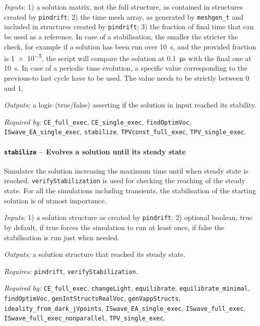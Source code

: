 		\textit{Inputs:} 1) a solution matrix, not the full structure, as contained in
		structures created by \texttt{pin\-drift};
		2) the time mesh array, as generated by \texttt{meshgen\_t} and included
		in structures created by \texttt{pin\-drift};
		3) the fraction of final time that can be used as a
		reference. In case of a stabilisation, the smaller the stricter the
		check, for example if a solution has been run over \SI{10}{\s}, and the provided fraction is \num{1e-5}, the script will compare the solution at \SI{0.1}{\us} with the final one at \SI{10}{\s}. In case of a periodic time evolution, a specific value
		corresponding to the previous-to last cycle have to be used. The
		value needs to be strictly between 0 and 1.

		\textit{Outputs:} a logic (true/false) asserting if the solution in input reached its stability.


		\textit{Required by:} \texttt{CE\_full\_exec}, \texttt{CE\_single\_exec}, \texttt{find\-Optim\-Voc}, \texttt{IS\-wave\_EA\_single\_exec}, \texttt{stabilize}, \texttt{TPV\-const\_full\_exec}, \texttt{TPV\_single\_exec}.

		\paragraph{\texttt{stabilize} -- Evolves a solution until its steady state}
		Simulates the solution increasing the maximum time until when steady state is reached.
		\texttt{verify\-Stabilization} is used for checking the reaching of the steady state.
		For all the simulations including transients, the stabilisation of the starting solution is of utmost importance.

		\textit{Inputs:} 1) a solution structure as created by \texttt{pin\-drift};
		2) optional boolean, true by default,
		if true forces the simulation to run at least once, if false the
		stabilisation is run just when needed.

		\textit{Outputs:} a solution structure that reached its steady state.

		\textit{Requires:} \texttt{pin\-drift}, \texttt{verify\-Stabilization}.

		\textit{Required by:} \texttt{CE\_full\_exec}, \texttt{change\-Light}, \texttt{equilibrate}, \texttt{equilibrate\_minimal}, \texttt{find\-Optim\-Voc}, \texttt{gen\-Int\-Structs\-Real\-Voc}, \texttt{gen\-Vapp\-Structs}, \texttt{ideality\_from\_dark\_jVpoints}, \texttt{IS\-wave\_EA\_single\_exec}, \texttt{IS\-wave\_full\_exec}, \texttt{IS\-wave\_full\_exec\_nonparallel}, \texttt{TPV\_single\_exec}.


